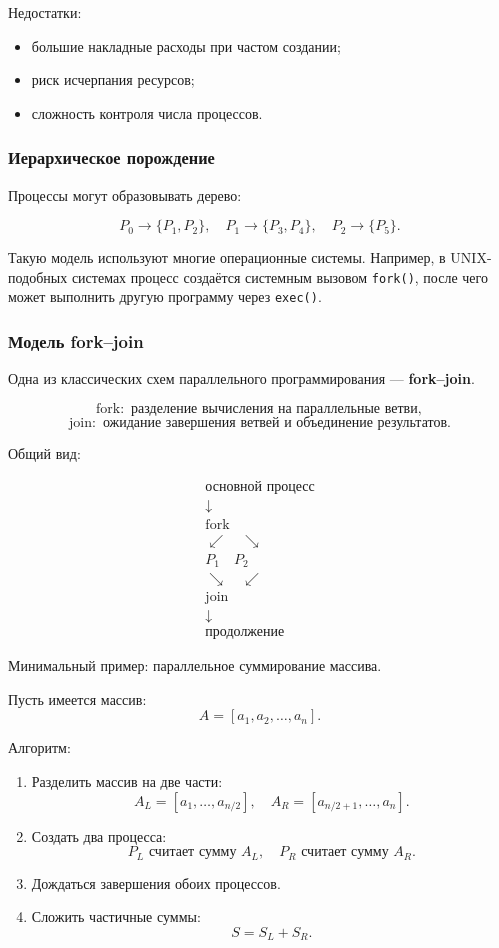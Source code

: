 \documentclass[12pt,a4paper]{article}
\begin{document}
Недостатки:
\begin{itemize}
    \item большие накладные расходы при частом создании;
    \item риск исчерпания ресурсов;
    \item сложность контроля числа процессов.
\end{itemize}

\subsubsection{Иерархическое порождение}

Процессы могут образовывать дерево:

\[
P_0
\rightarrow
\{P_1, P_2\},
\quad
P_1 \rightarrow \{P_3, P_4\},
\quad
P_2 \rightarrow \{P_5\}.
\]

Такую модель используют многие операционные системы. Например, в UNIX-подобных системах процесс создаётся системным вызовом \texttt{fork()}, после чего может выполнить другую программу через \texttt{exec()}.

\subsubsection{Модель fork--join}

Одна из классических схем параллельного программирования --- \textbf{fork--join}.

\[
\text{fork}: \text{ разделение вычисления на параллельные ветви},
\]
\[
\text{join}: \text{ ожидание завершения ветвей и объединение результатов}.
\]

Общий вид:

\[
\begin{array}{c}
\text{основной процесс} \\
\downarrow \\
\text{fork} \\
\swarrow \quad \searrow \\
P_1 \quad P_2 \\
\searrow \quad \swarrow \\
\text{join} \\
\downarrow \\
\text{продолжение}
\end{array}
\]

Минимальный пример: параллельное суммирование массива.

Пусть имеется массив:
\[
A = [a_1, a_2, \ldots, a_n].
\]

Алгоритм:
\begin{enumerate}
    \item Разделить массив на две части:
    \[
    A_L = [a_1,\ldots,a_{n/2}], \quad A_R = [a_{n/2+1},\ldots,a_n].
    \]
    \item Создать два процесса:
    \[
    P_L \text{ считает сумму } A_L,\quad P_R \text{ считает сумму } A_R.
    \]
    \item Дождаться завершения обоих процессов.
    \item Сложить частичные суммы:
    \[
    S = S_L + S_R.
    \]
\end{enumerate}
\end{document}
